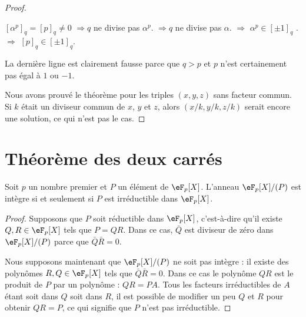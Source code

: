 \begin{proof}
\begin{subproof}
		\( [\alpha^p]_q=[p]_q\neq 0\)
		\( \Rightarrow\)\( q\) ne divise pas \( \alpha^p\).\newline
		\( \Rightarrow\)\( q\) ne divise pas \( \alpha\).\newline
		\( \Rightarrow\) \( \alpha^p\in [\pm1]_q\)  .\newline
		\( \Rightarrow\) \([p]_q\in [\pm1]_q\).

		La dernière ligne est clairement fausse parce que \( q>p\) et \( p\) n'est certainement pas égal à \( 1\) ou \( -1\).
	\end{subproof}

	Nous avons prouvé le théorème pour les triples \( (x,y,z)\) sans facteur commun. Si \( k\) était un diviseur commun de \( x\), \( y\) et \( z\), alors \( (x/k,y/k,z/k)\) serait encore une solution, ce qui n'est pas le cas.
\end{proof}


\section{Théorème des deux carrés}

\begin{proposition} \label{PropleGdaT}
	Soit \( p\) un nombre premier et \( P\) un élément de \( \eF_p[X]\). L'anneau \( \eF_p[X]/(P)\) est intègre si et seulement si \( P\) est irréductible dans \( \eF_p[X]\).
\end{proposition}

\begin{proof}
	Supposons que \( P\) soit réductible dans \( \eF_p[X]\), c'est-à-dire qu'il existe \( Q,R\in \eF_p[X]\) tels que \( P=QR\). Dans ce cas, \( \bar Q\) est diviseur de zéro dans \( \eF_p[X]/(P)\) parce que \( \bar Q\bar R=0\).

	Nous supposons maintenant que \( \eF_p[X]/(P)\) ne soit pas intègre : il existe des polynômes \( R,Q\in \eF_p[X]\) tels que \( \bar Q\bar R=0\). Dans ce cas le polynôme \( QR\) est le produit de \( P\) par un polynôme : \( QR=PA\). Tous les facteurs irréductibles de \( A \) étant soit dans \( Q\) soit dans \( R\), il est possible de modifier un peu \( Q\) et \( R\) pour obtenir \( QR=P\), ce qui signifie que \( P\) n'est pas irréductible.
\end{proof}

